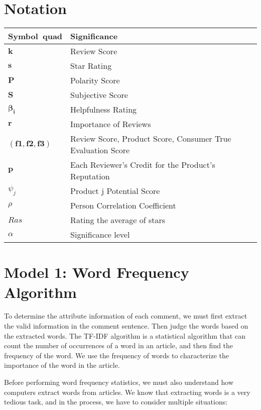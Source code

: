 \documentclass{mcmthesis}
\begin{document}
\section{Notation}
\begin{table}[h]
\centering

\begin{tabular}{lll}
	\toprule
	Symbol\ quad\quad\quad\quad\quad\quad\quad\quad\quad &Significance  \\
	\midrule
	$ \mathbf{k}  $   &  Review Score
	\\
	$ \mathbf{s}  $   & Star Rating
	\\
	$ \mathbf{P}  $   & Polarity Score
	\\
	$ \mathbf{S}  $   & Subjective Score
	\\
	$  \mathbf{\beta_i} $   & Helpfulness Rating
	\\
	$\mathbf{r}   $   & Importance of Reviews
	\\
	$ (\boldsymbol{f1},\boldsymbol{f2},\boldsymbol{f3})  $   & Review Score, Product Score, Consumer True Evaluation Score
	\\
	$  \mathbf{p} $   &Each Reviewer's Credit for the Product's Reputation
	\\
	$ \psi_j $   &  Product j Potential Score
	\\
	$  \rho $   & Person Correlation Coefficient
	\\	
	$  Ras $     & Rating the average of stars
	\\
	$ \alpha $ & Significance level
	\\
	\bottomrule
\end{tabular}
\end{table}

\section{Model 1: Word Frequency Algorithm}

To determine the attribute information of each comment, we must first extract the valid information in the comment sentence. Then judge the words based on the extracted words. The TF-IDF algorithm is a statistical algorithm that can count the number of occurrences of a word in an article, and then find the frequency of the word. We use the frequency of words to characterize the importance of the word in the article.

Before performing word frequency statistics, we must also understand how computers extract words from articles. We know that extracting words is a very tedious task, and in the process, we have to consider multiple situations:
\end{document}
